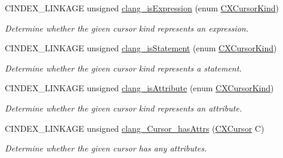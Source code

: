 \begin{DoxyCompactItemize}
\mbox{\label{group__CINDEX__CURSOR__MANIP_ga8e537f2f251a92a799d6cc8459614d42}} 
C\+I\+N\+D\+E\+X\+\_\+\+L\+I\+N\+K\+A\+GE unsigned \mbox{\hyperlink{group__CINDEX__CURSOR__MANIP_ga8e537f2f251a92a799d6cc8459614d42}{clang\+\_\+is\+Expression}} (enum \mbox{\hyperlink{group__CINDEX_gaaccc432245b4cd9f2d470913f9ef0013}{C\+X\+Cursor\+Kind}})
\begin{DoxyCompactList}\small\item\em Determine whether the given cursor kind represents an expression. \end{DoxyCompactList}\item 
\mbox{\label{group__CINDEX__CURSOR__MANIP_ga33c9d1d9cf46a316160f68356608773a}} 
C\+I\+N\+D\+E\+X\+\_\+\+L\+I\+N\+K\+A\+GE unsigned \mbox{\hyperlink{group__CINDEX__CURSOR__MANIP_ga33c9d1d9cf46a316160f68356608773a}{clang\+\_\+is\+Statement}} (enum \mbox{\hyperlink{group__CINDEX_gaaccc432245b4cd9f2d470913f9ef0013}{C\+X\+Cursor\+Kind}})
\begin{DoxyCompactList}\small\item\em Determine whether the given cursor kind represents a statement. \end{DoxyCompactList}\item 
\mbox{\label{group__CINDEX__CURSOR__MANIP_ga204227c8c254c568ef6d577ffcf8d3e5}} 
C\+I\+N\+D\+E\+X\+\_\+\+L\+I\+N\+K\+A\+GE unsigned \mbox{\hyperlink{group__CINDEX__CURSOR__MANIP_ga204227c8c254c568ef6d577ffcf8d3e5}{clang\+\_\+is\+Attribute}} (enum \mbox{\hyperlink{group__CINDEX_gaaccc432245b4cd9f2d470913f9ef0013}{C\+X\+Cursor\+Kind}})
\begin{DoxyCompactList}\small\item\em Determine whether the given cursor kind represents an attribute. \end{DoxyCompactList}\item 
\mbox{\label{group__CINDEX__CURSOR__MANIP_ga2bcf84ce3d5158457451e051afbdc8dd}} 
C\+I\+N\+D\+E\+X\+\_\+\+L\+I\+N\+K\+A\+GE unsigned \mbox{\hyperlink{group__CINDEX__CURSOR__MANIP_ga2bcf84ce3d5158457451e051afbdc8dd}{clang\+\_\+\+Cursor\+\_\+has\+Attrs}} (\mbox{\hyperlink{structCXCursor}{C\+X\+Cursor}} C)
\begin{DoxyCompactList}\small\item\em Determine whether the given cursor has any attributes. \end{DoxyCompactList}\item 

\end{DoxyCompactItemize}
